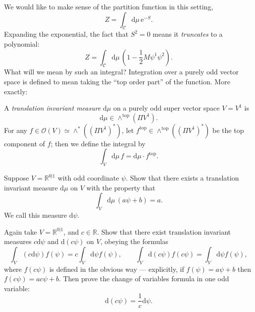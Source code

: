\documentclass[12pt,letterpaper,reqno]{article}
\numberwithin{equation}{section}
\newcommand{\cC}{\ensuremath{\mathcal C}}
\newcommand{\cO}{\ensuremath{\mathcal O}}
\newcommand{\R}{\ensuremath{\mathbb R}}
\newcommand{\half}{\ensuremath{\frac{1}{2}}}
\newcommand{\e}{{\mathrm e}}
\newcommand{\de}{\mathrm{d}}
\newcommand{\rmtop}{\mathrm{top}}
\newcommand{\ti}[1]{\textit{#1}}
\begin{document}
We would like to make sense of the partition function in this setting,
\begin{equation} \label{eq:2-fermion-partition-function}
  Z = \int_\cC \de\mu \, \e^{-S}.
\end{equation}
Expanding the exponential, the fact that $S^2 = 0$ means it \ti{truncates} to a polynomial:
\begin{equation} \label{eq:2-fermion-partition-function-expanded}
  Z = \int_\cC \de \mu \, \left(1 - \half M \psi^1 \psi^2\right).
\end{equation}
What will we mean by such an integral?
Integration over a purely odd vector space is defined to mean taking the
``top order part'' of the function.
More exactly: 

\begin{defn} \label{defn:odd-integral} A \ti{translation invariant measure} $\de \mu$ 
on a purely odd super vector space $V = V^1$
is
\begin{equation} \label{eq:measure-odd-vector-space}
  \de \mu \in \wedge^\rmtop(\Pi V^1).
\end{equation}
For any $f \in \cO(V) \simeq \wedge^*((\Pi V^1)^*)$, let
$f^\rmtop \in \wedge^\rmtop((\Pi V^1)^*)$ be the top component of $f$; then
we define the integral by
\begin{equation}
  \int_V \de \mu \, f = \de\mu \cdot f^\rmtop.
\end{equation}
\end{defn}

\begin{exercise} Suppose $V = \R^{0 \vert 1}$ with odd coordinate $\psi$.
Show that there exists a translation invariant measure $\de \mu$ on $V$ with the property that
\begin{equation}
\int_V \de \mu \, (a \psi + b) = a.
\end{equation}
We call this measure $\de \psi$.
\end{exercise}

\begin{exercise} Again take $V = \R^{0 \vert 1}$, and $c \in \R$.
Show that there exist translation invariant measures $c \de \psi$ and $\de (c \psi)$
on $V$, obeying the formulas
\begin{equation}
  \int_V (c \de \psi) f(\psi) = c \int_V \de \psi f(\psi), \qquad \int_V \de(c \psi) f(c \psi) = \int_V \de \psi f(\psi),
\end{equation}
where $f(c \psi)$ is defined in the obvious way --- explicitly,
if $f(\psi) = a \psi + b$ then $f(c \psi) = a c \psi + b$.
Then prove the change of variables formula in one odd variable:
\begin{equation}
  \de (c \psi) = \frac{1}{c} \de \psi.
\end{equation}
\end{exercise}
\end{document}

